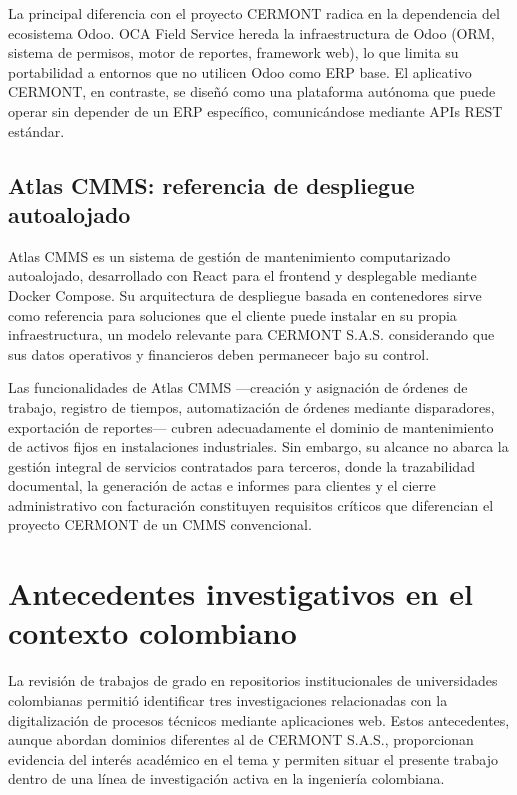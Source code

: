 La principal diferencia con el proyecto CERMONT radica en la dependencia del ecosistema Odoo. OCA Field Service hereda la infraestructura de Odoo (ORM, sistema de permisos, motor de reportes, framework web), lo que limita su portabilidad a entornos que no utilicen Odoo como ERP base. El aplicativo CERMONT, en contraste, se diseñó como una plataforma autónoma que puede operar sin depender de un ERP específico, comunicándose mediante APIs REST estándar.

\subsection{Atlas CMMS: referencia de despliegue autoalojado}

Atlas CMMS \cite{atlas2024} es un sistema de gestión de mantenimiento computarizado autoalojado, desarrollado con React para el frontend y desplegable mediante Docker Compose. Su arquitectura de despliegue basada en contenedores sirve como referencia para soluciones que el cliente puede instalar en su propia infraestructura, un modelo relevante para CERMONT S.A.S. considerando que sus datos operativos y financieros deben permanecer bajo su control.

Las funcionalidades de Atlas CMMS —creación y asignación de órdenes de trabajo, registro de tiempos, automatización de órdenes mediante disparadores, exportación de reportes— cubren adecuadamente el dominio de mantenimiento de activos fijos en instalaciones industriales. Sin embargo, su alcance no abarca la gestión integral de servicios contratados para terceros, donde la trazabilidad documental, la generación de actas e informes para clientes y el cierre administrativo con facturación constituyen requisitos críticos que diferencian el proyecto CERMONT de un CMMS convencional.

\section{Antecedentes investigativos en el contexto colombiano}
\label{sec:antecedentes-colombia}

La revisión de trabajos de grado en repositorios institucionales de universidades colombianas permitió identificar tres investigaciones relacionadas con la digitalización de procesos técnicos mediante aplicaciones web. Estos antecedentes, aunque abordan dominios diferentes al de CERMONT S.A.S., proporcionan evidencia del interés académico en el tema y permiten situar el presente trabajo dentro de una línea de investigación activa en la ingeniería colombiana.

